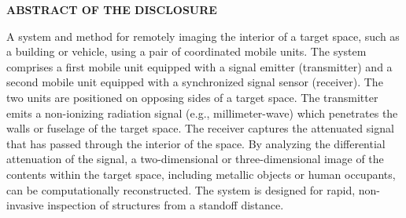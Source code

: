 \documentclass[11pt,letterpaper]{article}
\begin{document}
\thispagestyle{empty}

\begin{center}
    \textbf{\large ABSTRACT OF THE DISCLOSURE}
\end{center}

\vspace{0.6cm}

A system and method for remotely imaging the interior of a target space, such as a building or vehicle, using a pair of coordinated mobile units. The system comprises a first mobile unit equipped with a signal emitter (transmitter) and a second mobile unit equipped with a synchronized signal sensor (receiver). The two units are positioned on opposing sides of a target space. The transmitter emits a non-ionizing radiation signal (e.g., millimeter-wave) which penetrates the walls or fuselage of the target space. The receiver captures the attenuated signal that has passed through the interior of the space. By analyzing the differential attenuation of the signal, a two-dimensional or three-dimensional image of the contents within the target space, including metallic objects or human occupants, can be computationally reconstructed. The system is designed for rapid, non-invasive inspection of structures from a standoff distance.
\end{document}
